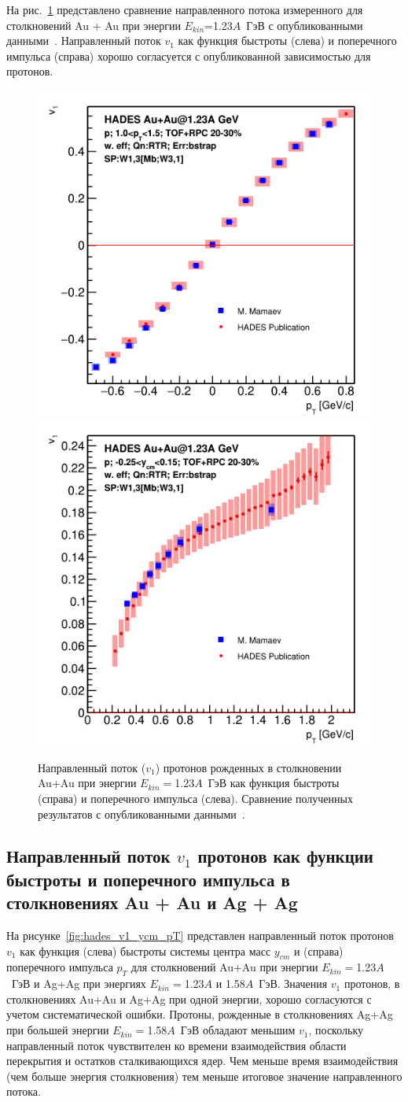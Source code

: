 На рис.~\ref{fig:hades_v1_publ_comparison} представлено сравнение направленного потока измеренного для столкновений Au + Au при энергии $E_{kin}$=1.23$A$~ГэВ с опубликованными данными~\cite{HADES:2020lob}.
Направленный поток $v_1$ как функция быстроты (слева) и поперечного импульса (справа) хорошо согласуется с опубликованной зависимостью для протонов.
%
\begin{figure}[ht]
\begin{center}
\includegraphics[width=0.45\linewidth]{images/v1_au123_publication_ycm.png}
\includegraphics[width=0.45\linewidth]{images/v1_au123_publication_pT.png}
\caption{Направленный поток ($v_1$) протонов  рожденных в столкновении Au+Au при энергии $E_{kin}=$1.23$A$~ГэВ как функция быстроты (справа) и поперечного импульса (слева). Сравнение полученных результатов с опубликованными данными~\cite{HADES:2020lob}. }
\label{fig:hades_v1_publ_comparison}
\end{center}
\end{figure}

\subsection{Направленный поток $v_1$ протонов как функции быстроты и поперечного импульса в столкновениях Au + Au и Ag + Ag}

На рисунке~\ref{fig:hades_v1_ycm_pT} представлен направленный поток протонов $v_1$ как функция (слева) быстроты системы центра масс $y_{cm}$ и (справа) поперечного импульса $p_T$ для столкновений Au+Au при энергии $E_{kin}=$1.23$A$~ГэВ и Ag+Ag при энергиях $E_{kin}=$1.23$A$ и 1.58$A$~ГэВ.
Значения $v_1$ протонов, в столкновениях Au+Au и Ag+Ag при одной энергии, хорошо согласуются с учетом систематической ошибки. 
Протоны, рожденные в столкновениях Ag+Ag при большей энергии $E_{kin}=$1.58$A$~ГэВ обладают меньшим $v_1$, поскольку направленный поток чувствителен ко времени взаимодействия области перекрытия и остатков сталкивающихся ядер.
Чем меньше время взаимодействия (чем больше энергия столкновения) тем меньше итоговое значение направленного потока.

